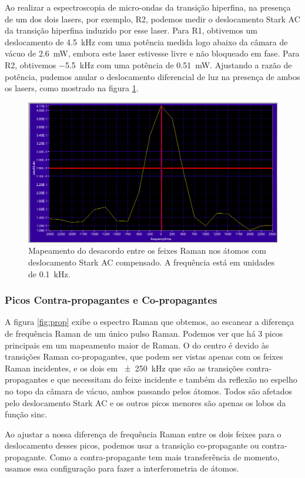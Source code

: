 Ao realizar a espectroscopia de micro-ondas da transição hiperfina, na presença de um dos dois lasers, por exemplo, R2, podemos medir o deslocamento Stark AC da transição hiperfina induzido por esse laser. Para R1, obtivemos um deslocamento de \SI{4.5}{kHz} com uma potência medida logo abaixo da câmara de vácuo de \SI{2.6}{mW}, embora este laser estivesse livre e não bloqueado em fase. Para R2, obtivemos \SI{-5.5}{kHz} com uma potência de \SI{0.51}{mW}. Ajustando a razão de potência, pudemos anular o deslocamento diferencial de luz na presença de ambos os lasers, como mostrado na figura \ref{fig:stark}.

\begin{figure}
    \centering
    \includegraphics[width=0.5\linewidth]{figures/ResScan11.png}
    \caption{Mapeamento do desacordo entre os feixes Raman nos átomos com deslocamento Stark AC compensado. A frequência está em unidades de \SI{0.1}{kHz}.}
    \label{fig:stark}
\end{figure}

\subsubsection{Picos Contra-propagantes e Co-propagantes}
A figura \ref{fig:prop} exibe o espectro Raman que obtemos, ao escanear a diferença de frequência Raman de um único pulso Raman. Podemos ver que há 3 picos principais em um mapeamento maior de Raman. O do centro é devido às transições Raman co-propagantes, que podem ser vistas apenas com os feixes Raman incidentes, e os dois em \SI{\pm 250}{kHz} que são as transições contra-propagantes e que necessitam do feixe incidente e também da reflexão no espelho no topo da câmara de vácuo, ambos passando pelos átomos. Todos são afetados pelo deslocamento Stark AC e os outros picos menores são apenas os lobos da função sinc.

Ao ajustar a nossa diferença de frequência Raman entre os dois feixes para o deslocamento desses picos, podemos usar a transição co-propagante ou contra-propagante. Como a contra-propagante tem mais transferência de momento, usamos essa configuração para fazer a interferometria de átomos.

